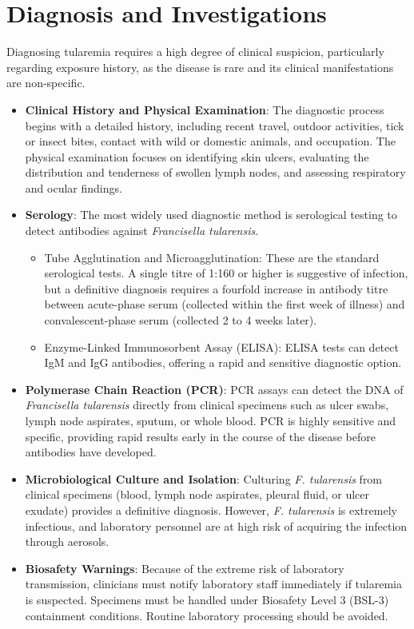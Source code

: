 \section*{Diagnosis and Investigations}
Diagnosing tularemia requires a high degree of clinical suspicion, particularly regarding exposure history, as the disease is rare and its clinical manifestations are non-specific.
\begin{itemize}
    \item \textbf{Clinical History and Physical Examination}: The diagnostic process begins with a detailed history, including recent travel, outdoor activities, tick or insect bites, contact with wild or domestic animals, and occupation. The physical examination focuses on identifying skin ulcers, evaluating the distribution and tenderness of swollen lymph nodes, and assessing respiratory and ocular findings.
    \item \textbf{Serology}: The most widely used diagnostic method is serological testing to detect antibodies against \textit{Francisella tularensis}.
    \begin{itemize}
        \item Tube Agglutination and Microagglutination: These are the standard serological tests. A single titre of 1:160 or higher is suggestive of infection, but a definitive diagnosis requires a fourfold increase in antibody titre between acute-phase serum (collected within the first week of illness) and convalescent-phase serum (collected 2 to 4 weeks later).
        \item Enzyme-Linked Immunosorbent Assay (ELISA): ELISA tests can detect IgM and IgG antibodies, offering a rapid and sensitive diagnostic option.
    \end{itemize}
    \item \textbf{Polymerase Chain Reaction (PCR)}: PCR assays can detect the DNA of \textit{Francisella tularensis} directly from clinical specimens such as ulcer swabs, lymph node aspirates, sputum, or whole blood. PCR is highly sensitive and specific, providing rapid results early in the course of the disease before antibodies have developed.
    \item \textbf{Microbiological Culture and Isolation}: Culturing \textit{F. tularensis} from clinical specimens (blood, lymph node aspirates, pleural fluid, or ulcer exudate) provides a definitive diagnosis. However, \textit{F. tularensis} is extremely infectious, and laboratory personnel are at high risk of acquiring the infection through aerosols.
    \item \textbf{Biosafety Warnings}: Because of the extreme risk of laboratory transmission, clinicians must notify laboratory staff immediately if tularemia is suspected. Specimens must be handled under Biosafety Level 3 (BSL-3) containment conditions. Routine laboratory processing should be avoided.

\end{itemize}
